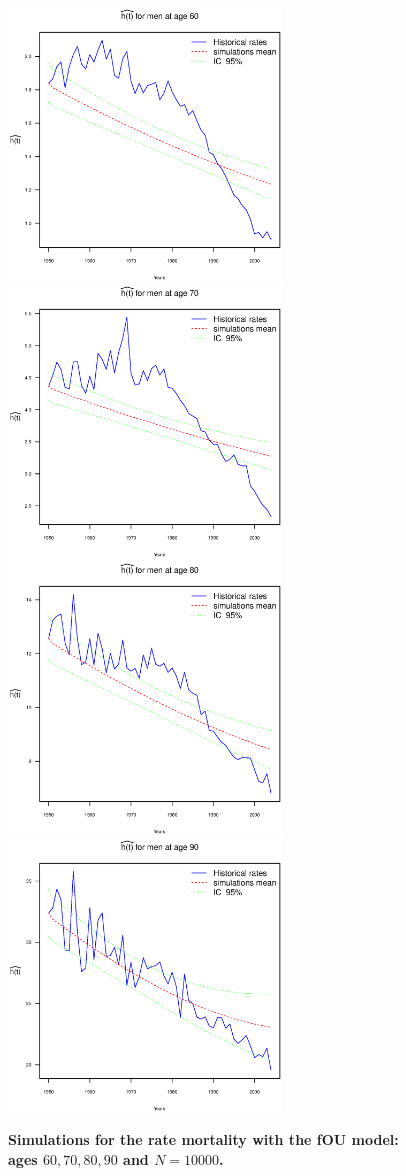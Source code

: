 \documentclass[smallextended]{svjour3}
\begin{document}
\begin{figure}[H]
    \includegraphics[width = 2.85in]{PlotMen60.eps}
    \includegraphics[width = 2.85in]{PlotMen70.eps}
    \includegraphics[width = 2.85in]{PlotMen80.eps}
    \includegraphics[width = 2.85in]{PlotMen90.eps}
    \caption{\bf Simulations for the rate mortality with the fOU model: ages
    $60,70,80,90$ and $N=10000$.}
    \label{graph-simu_FOU4}
\end{figure}\vspace*{0.1cm}
\end{document}

